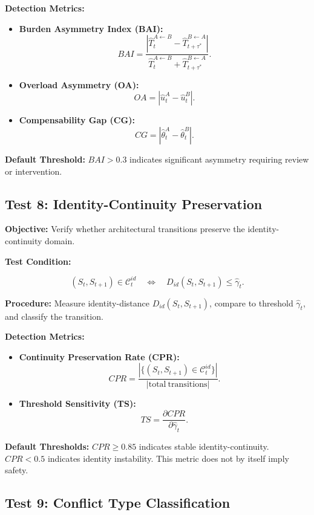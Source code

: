 \documentclass[11pt,a4paper]{article}
\theoremstyle{breakstyle}
\newcommand{\Cid}{\mathcal{C}^{id}}
\newcommand{\That}{\widehat{T}}
\newcommand{\thetahat}{\widehat{\theta}}
\newcommand{\uhat}{\widehat{u}}
\begin{document}
	\textbf{Detection Metrics:}
	\begin{itemize}
		\item \textbf{Burden Asymmetry Index (BAI):}
		\[
		BAI =
		\frac{
			|\That^{A \leftarrow B}_{t}
			-
			\That^{B \leftarrow A}_{t+\tau^*}|
		}{
			\That^{A \leftarrow B}_{t}
			+
			\That^{B \leftarrow A}_{t+\tau^*}
		}.
		\]
		
		\item \textbf{Overload Asymmetry (OA):}
		\[
		OA =
		|\uhat^A_t - \uhat^B_t|.
		\]
		
		\item \textbf{Compensability Gap (CG):}
		\[
		CG =
		|\thetahat^A_t - \thetahat^B_t|.
		\]
	\end{itemize}
	
	\textbf{Default Threshold:} $BAI > 0.3$ indicates significant asymmetry requiring review or intervention.
	
	\subsection*{Test 8: Identity-Continuity Preservation}
	
	\textbf{Objective:} Verify whether architectural transitions preserve the identity-continuity domain.
	
	\textbf{Test Condition:}
	
	\[
	(S_t,S_{t+1}) \in \Cid_t
	\quad \Longleftrightarrow \quad
	D_{id}(S_t,S_{t+1}) \leq \hat{\gamma}_t.
	\]
	
	\textbf{Procedure:} Measure identity-distance $D_{id}(S_t,S_{t+1})$, compare to threshold $\hat{\gamma}_t$, and classify the transition.
	
	\textbf{Detection Metrics:}
	\begin{itemize}
		\item \textbf{Continuity Preservation Rate (CPR):}
		\[
		CPR =
		\frac{
			|\{(S_t,S_{t+1}) \in \Cid_t\}|
		}{
			|\mathrm{total\ transitions}|
		}.
		\]
		
		\item \textbf{Threshold Sensitivity (TS):}
		\[
		TS =
		\frac{\partial CPR}{\partial \hat{\gamma}_t}.
		\]
	\end{itemize}
	
	\textbf{Default Thresholds:} $CPR \geq 0.85$ indicates stable identity-continuity. $CPR < 0.5$ indicates identity instability. This metric does not by itself imply safety.
	
	\subsection*{Test 9: Conflict Type Classification}
	
\end{document}
